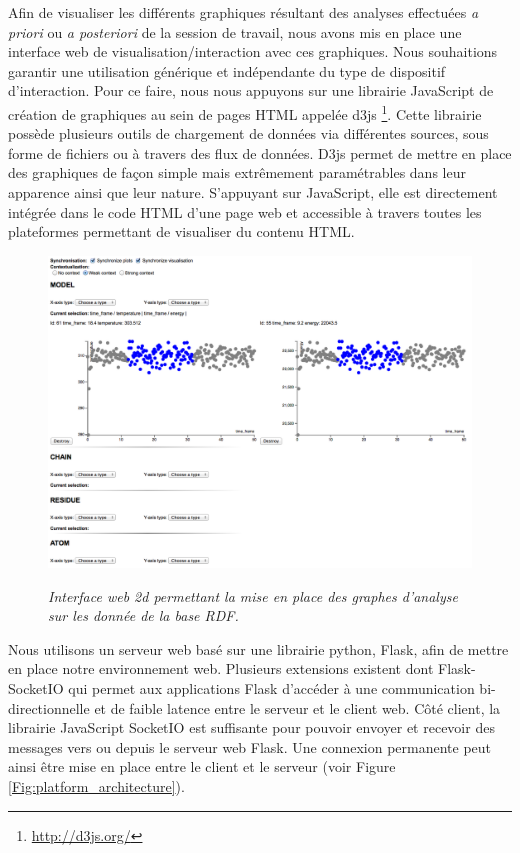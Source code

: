 Afin de visualiser les différents graphiques résultant des analyses effectuées \textit{a priori} ou \textit{a posteriori} de la session de travail, nous avons mis en place une interface web de visualisation/interaction avec ces graphiques. Nous souhaitions garantir une utilisation générique et indépendante du type de dispositif d'interaction. Pour ce faire, nous nous appuyons sur une librairie JavaScript de création de graphiques au sein de pages HTML appelée d3js \footnote{\url{http://d3js.org/}}. Cette librairie possède plusieurs outils de chargement de données via différentes sources, sous forme de fichiers ou à travers des flux de données. D3js permet de mettre en place des graphiques de façon simple mais extrêmement paramétrables dans leur apparence ainsi que leur nature. S'appuyant sur JavaScript, elle est directement intégrée dans le code HTML d'une page web et accessible à travers toutes les plateformes permettant de visualiser du contenu HTML.

\begin{figure}[htb]
  \centering
  {\includegraphics[width=1.0\linewidth]{./figures/ch5/2d_interface}}
    \caption[Interface web 2d pour la visualisation de graphes d'analyses.]{{\it Interface web 2d permettant la mise en place des graphes d'analyse sur les donnée de la base RDF.}}
  \label{Fig:2d_interface}
  \hspace{0.3cm}
\end{figure}

Nous utilisons un serveur web basé sur une librairie python, Flask, afin de mettre en place notre environnement web. Plusieurs extensions existent dont Flask-SocketIO qui permet aux applications Flask d'accéder à une communication bi-directionnelle et de faible latence entre le serveur et le client web. Côté client, la librairie JavaScript SocketIO est suffisante pour pouvoir envoyer et recevoir des messages vers ou depuis le serveur web Flask. Une connexion permanente peut ainsi être mise en place entre le client et le serveur (voir Figure \ref{Fig:platform_architecture}).


